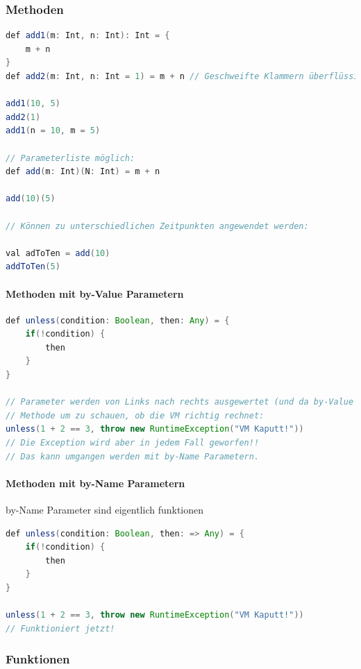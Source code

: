 \subsubsection{Methoden}

\begin{lstlisting}[language=java]
def add1(m: Int, n: Int): Int = {
	m + n
}
def add2(m: Int, n: Int = 1) = m + n // Geschweifte Klammern überflüssig bei einzelner Expression

add1(10, 5)
add2(1)
add1(n = 10, m = 5)

// Parameterliste möglich:
def add(m: Int)(N: Int) = m + n

add(10)(5)

// Können zu unterschiedlichen Zeitpunkten angewendet werden:

val adToTen = add(10)
addToTen(5)
\end{lstlisting}

\paragraph{Methoden mit by-Value Parametern}

\begin{lstlisting}[language=java]
def unless(condition: Boolean, then: Any) = {
	if(!condition) {
		then
	}
}

// Parameter werden von Links nach rechts ausgewertet (und da by-Value zuerst evaluiert.)
// Methode um zu schauen, ob die VM richtig rechnet:
unless(1 + 2 == 3, throw new RuntimeException("VM Kaputt!"))
// Die Exception wird aber in jedem Fall geworfen!!
// Das kann umgangen werden mit by-Name Parametern.

\end{lstlisting}

\paragraph{Methoden mit by-Name Parametern}

by-Name Parameter sind eigentlich funktionen %

\begin{lstlisting}[language=java]
def unless(condition: Boolean, then: => Any) = {
	if(!condition) {
		then
	}
}

unless(1 + 2 == 3, throw new RuntimeException("VM Kaputt!"))
// Funktioniert jetzt!
\end{lstlisting}

\subsubsection{Funktionen}

